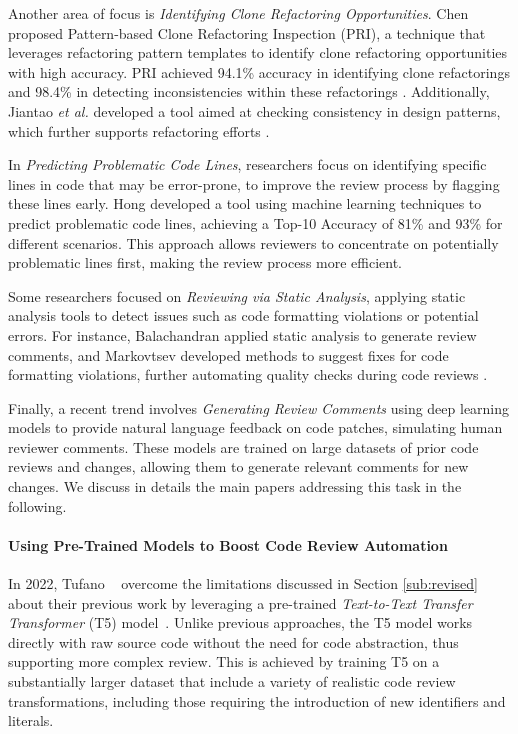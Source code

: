 Another area of focus is \textit{Identifying Clone Refactoring Opportunities}.
Chen \etal proposed Pattern-based Clone Refactoring Inspection (PRI), a
technique that leverages refactoring pattern templates to identify clone
refactoring opportunities with high accuracy. PRI achieved 94.1\% accuracy in
identifying clone refactorings and 98.4\% in detecting inconsistencies within
these refactorings \cite{chen:compsac2017}. Additionally, Jiantao \textit{et
	al.} developed a tool aimed at checking consistency in design patterns, which
further supports refactoring efforts \cite{he:sere2013}.

In \textit{Predicting Problematic Code Lines}, researchers focus on identifying
specific lines in code that may be error-prone, to improve the review process
by flagging these lines early. Hong \etal developed a tool using machine
learning techniques to predict problematic code lines, achieving a Top-10
Accuracy of 81\% and 93\% for different scenarios. This approach allows
reviewers to concentrate on potentially problematic lines first, making the
review process more efficient.

Some researchers focused on \textit{Reviewing via Static Analysis}, applying
static analysis tools to detect issues such as code formatting violations or
potential errors. For instance, Balachandran \etal applied static analysis to
generate review comments, and Markovtsev \etal developed methods to suggest
fixes for code formatting violations, further automating quality checks during
code reviews \cite{balachandran:icse2013,markovtsev:msr2019}.

Finally, a recent trend involves \textit{Generating Review Comments} using deep
learning models to provide natural language feedback on code patches,
simulating human reviewer comments. These models are trained on large datasets
of prior code reviews and changes, allowing them to generate relevant comments
for new changes. We discuss in details the main papers addressing this task in
the following.

\paragraph{Using Pre-Trained Models to Boost Code Review Automation}

In 2022, Tufano \etal~\cite{tufano:icse2022} overcome the limitations discussed
in Section \ref{sub:revised} about their previous work \cite{tufano:icse2021}
by leveraging a pre-trained \textit{Text-to-Text Transfer Transformer} (T5)
model~\cite{raffel:jmlr2019}. Unlike previous approaches, the T5 model works
directly with raw source code without the need for code abstraction, thus
supporting more complex review. This is achieved by training T5 on a
substantially larger dataset that include a variety of realistic code review
transformations, including those requiring the introduction of new identifiers
and literals.

